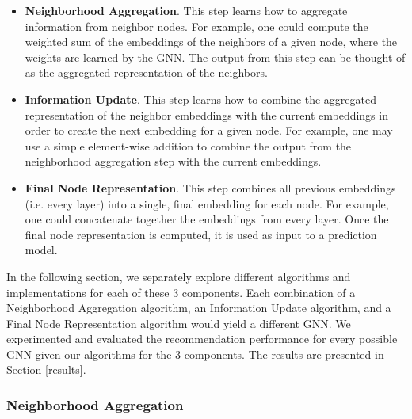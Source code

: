 \documentclass{article}
\begin{document}
\begin{itemize}
    \item \textbf{Neighborhood Aggregation}. This step learns how to aggregate information from neighbor nodes. For example, one could compute the weighted sum of the embeddings of the neighbors of a given node, where the weights are learned by the GNN. The output from this step can be thought of as the aggregated representation of the neighbors.
    \item \textbf{Information Update}. This step learns how to combine the aggregated representation of the neighbor embeddings with the current embeddings in order to create the next embedding for a given node. For example, one may use a simple element-wise addition to combine the output from the neighborhood aggregation step with the current embeddings.
    \item \textbf{Final Node Representation}. This step combines all previous embeddings (i.e. every layer) into a single, final embedding for each node. For example, one could concatenate together the embeddings from every layer. Once the final node representation is computed, it is used as input to a prediction model.
\end{itemize}

In the following section, we separately explore different algorithms and implementations for each of these 3 components. Each combination of a Neighborhood Aggregation algorithm, an Information Update algorithm, and a Final Node Representation algorithm would yield a different GNN. We experimented and evaluated the recommendation performance for every possible GNN given our algorithms for the 3 components. The results are presented in Section \ref{results}.

\subsubsection{Neighborhood Aggregation}
\end{document}
